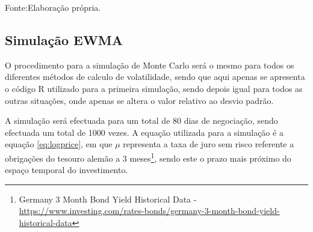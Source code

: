 \documentclass[
  12pt,
  a4paper,
  openany]{book}
\begin{document}
Fonte:Elaboração própria.

\justifying
\bigskip

\hypertarget{simulauxe7uxe3o-ewma}{%
\subsection{Simulação EWMA}\label{simulauxe7uxe3o-ewma}}

O procedimento para a simulação de Monte Carlo será o mesmo para todos os diferentes métodos de calculo de volatilidade, sendo que aqui apenas se apresenta o código R utilizado para a primeira simulação, sendo depois igual para todos as outras situações, onde apenas se altera o valor relativo ao desvio padrão.

A simulação será efectuada para um total de 80 dias de negociação, sendo efectuada um total de 1000 vezes. A equação utilizada para a simulação é a equação \eqref{eq:logprice}, em que \(\mu\) representa a taxa de juro sem risco referente a obrigações do tesouro alemão a 3 meses\footnote{Germany 3 Month Bond Yield Historical Data - \url{https://www.investing.com/rates-bonds/germany-3-month-bond-yield-historical-data}}, sendo este o prazo mais próximo do espaço temporal do investimento.

\scriptsize
\end{document}
